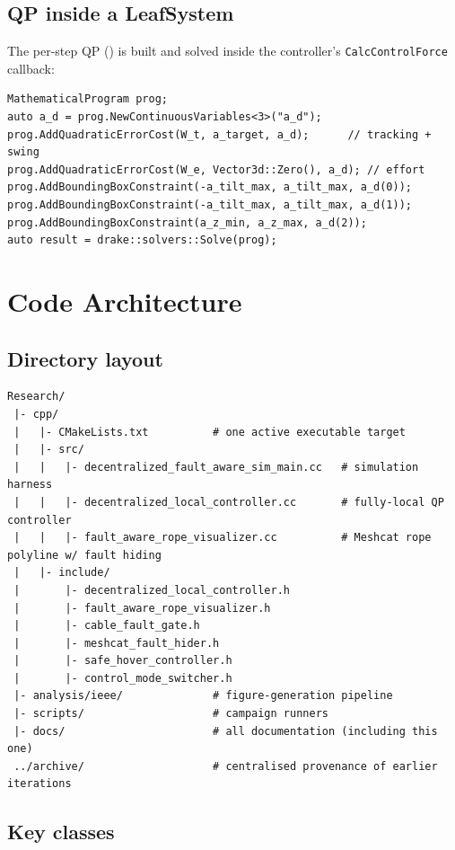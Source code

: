 \documentclass[11pt,a4paper,oneside]{report}
\begin{document}
\section{QP inside a LeafSystem}

The per-step QP () is built and solved inside the
controller's \texttt{CalcControlForce} callback:

\begin{lstlisting}[caption={QP construction, excerpted from decentralized\_local\_controller.cc}]
MathematicalProgram prog;
auto a_d = prog.NewContinuousVariables<3>("a_d");
prog.AddQuadraticErrorCost(W_t, a_target, a_d);      // tracking + swing
prog.AddQuadraticErrorCost(W_e, Vector3d::Zero(), a_d); // effort
prog.AddBoundingBoxConstraint(-a_tilt_max, a_tilt_max, a_d(0));
prog.AddBoundingBoxConstraint(-a_tilt_max, a_tilt_max, a_d(1));
prog.AddBoundingBoxConstraint(a_z_min, a_z_max, a_d(2));
auto result = drake::solvers::Solve(prog);
\end{lstlisting}

\chapter{Code Architecture}
\label{chap:code}

\section{Directory layout}

\begin{lstlisting}[style=shell,caption={Research/ folder after cleanup}]
Research/
 |- cpp/
 |   |- CMakeLists.txt          # one active executable target
 |   |- src/
 |   |   |- decentralized_fault_aware_sim_main.cc   # simulation harness
 |   |   |- decentralized_local_controller.cc       # fully-local QP controller
 |   |   |- fault_aware_rope_visualizer.cc          # Meshcat rope polyline w/ fault hiding
 |   |- include/
 |       |- decentralized_local_controller.h
 |       |- fault_aware_rope_visualizer.h
 |       |- cable_fault_gate.h
 |       |- meshcat_fault_hider.h
 |       |- safe_hover_controller.h
 |       |- control_mode_switcher.h
 |- analysis/ieee/              # figure-generation pipeline
 |- scripts/                    # campaign runners
 |- docs/                       # all documentation (including this one)
 ../archive/                    # centralised provenance of earlier iterations
\end{lstlisting}

\section{Key classes}
\end{document}
